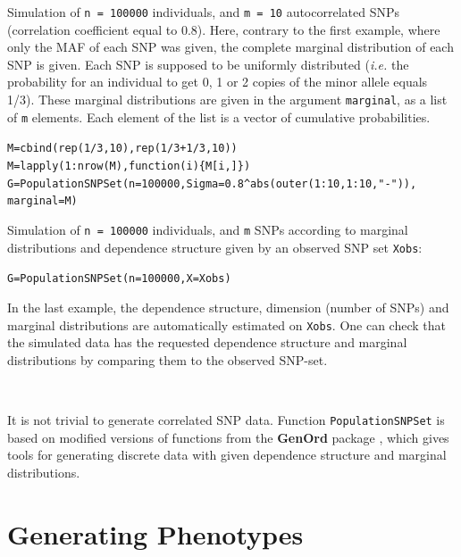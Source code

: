 \documentclass[12pt]{article}
\begin{document}
  	\noindent Simulation of \texttt{n = 100000} individuals, and \texttt{m = 10} autocorrelated SNPs (correlation coefficient equal to 0.8). Here, contrary to the first example, where only the MAF of each SNP was given, the complete marginal distribution of each SNP is given. Each SNP is supposed to be uniformly distributed (\emph{i.e.} the probability for an individual to get 0, 1 or 2 copies of the minor allele equals 1/3). These marginal distributions are given in the argument \texttt{marginal}, as a list of \texttt{m} elements. Each element of the list is a vector of cumulative probabilities.

 	\begin{alltt}
M = cbind(rep(1/3,10),rep(1/3+1/3,10))
M = lapply(1:nrow(M),function(i)\{M[i,]\})
G = PopulationSNPSet(n=100000,Sigma=0.8\^{}abs(outer(1:10,1:10,"-")),
\hspace*{2em}marginal=M)
 	\end{alltt}

 	\noindent Simulation of \texttt{n = 100000} individuals, and \texttt{m} SNPs according to marginal distributions and dependence structure given by an observed SNP set \texttt{Xobs}:

 	\begin{alltt}
G = PopulationSNPSet(n=100000,X=Xobs)
 	\end{alltt}

 	\noindent In the last example, the dependence structure, dimension (number of SNPs) and marginal distributions are automatically estimated on \texttt{Xobs}. One can check that the simulated data has the requested dependence structure and marginal distributions by comparing them to the observed SNP-set.

 	~

 	\noindent It is not trivial to generate correlated SNP data. Function \texttt{PopulationSNPSet} is based on modified versions of functions from the {\bfseries GenOrd} package \cite{GenOrd}, which gives tools for generating discrete data with given dependence structure and marginal distributions.

 	\section{Generating Phenotypes}
\end{document}
